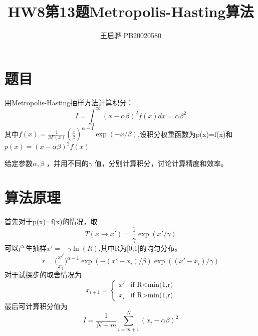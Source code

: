 \documentclass{article}
\title{\songti \zihao{2}\bfseries HW8第13题Metropolis-Hasting算法}
\author{王启骅 PB20020580}
\begin{document}
	\maketitle
	\section{题目}
	用Metropolis-Hasting抽样方法计算积分：
	\begin{equation}
		I=\int_{0}^{\infty}(x-\alpha\beta)^2f(x)dx=\alpha\beta^2
		\nonumber
	\end{equation}
其中$ f(x)=\frac{1}{\beta\Gamma(x)}(\frac{x}{\beta})^{\alpha-1}\exp(-x/\beta) $,设积分权重函数为p(x)=f(x)和$  p(x)=(x-\alpha\beta)^2f(x) $


给定参数$ \alpha,\beta $ ，并用不同的$ \gamma $ 值，分别计算积分，讨论计算精度和效率。
	
	\section{算法原理}
首先对于p(x)=f(x)的情况，取
\begin{equation}
	T(x\rightarrow x')=\frac{1}{\gamma}\exp(x'/\gamma)
\end{equation}
可以产生抽样$ x'=-\gamma \ln(R) $,其中R为[0,1]的均匀分布。
\begin{equation}
	r=\big(\frac{x'}{x_i}\big)^{\alpha-1}\exp(-(x'-x_i)/\beta)\exp((x'-x_i)/\gamma)
\end{equation}
对于试探步的取舍情况为
\begin{equation}
	x_{i+1}=
	\begin{cases}
		x'&\text{if R<min(1,r)}\\
		x_i&\text{if R>min(1,r)}
	\end{cases}
\end{equation}
最后可计算积分值为
\begin{equation}
	I=\frac{1}{N-m}\sum_{i=m+1}^{N}(x_i-\alpha\beta)^2
\end{equation}
\end{document}
